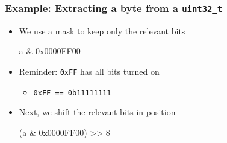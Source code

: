 \begin{frame}
  \frametitle{Example: Extracting a byte from a \texttt{uint32\_t}}
  \begin{itemize}
    \item We use a mask to keep only the relevant bits
          \begin{center} \ttfamily
            a \& 0x0000FF00
          \end{center}
    \item Reminder: \texttt{0xFF} has all bits turned on
          \begin{itemize}
            \item \texttt{0xFF == 0b11111111}
          \end{itemize}
    \item Next, we shift the relevant bits in position
          \begin{center} \ttfamily
            (a \& 0x0000FF00) >> 8
          \end{center}
  \end{itemize}
\end{frame}
